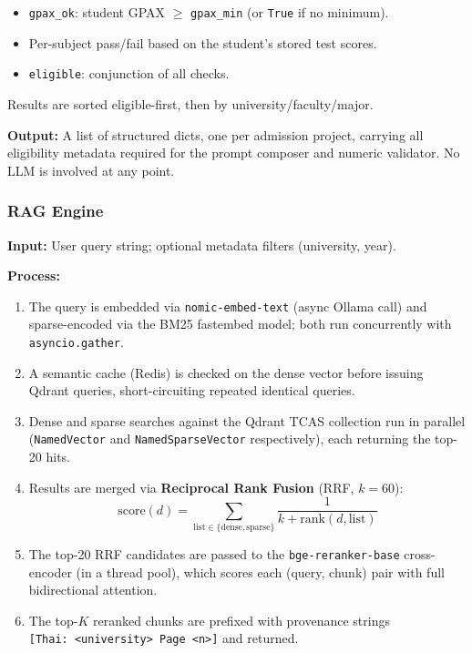 ﻿\documentclass[12pt,a4paper]{article}
\begin{document}
\begin{itemize}[leftmargin=2em]
    \item \texttt{gpax\_ok}: student GPAX $\geq$ \texttt{gpax\_min} (or \texttt{True}
    if no minimum).
    \item Per-subject pass/fail based on the student's stored test scores.
    \item \texttt{eligible}: conjunction of all checks.
\end{itemize}

Results are sorted eligible-first, then by university/faculty/major.

\textbf{Output:} A list of structured dicts, one per admission project, carrying
all eligibility metadata required for the prompt composer and numeric validator.
No LLM is involved at any point.

\subsubsection{RAG Engine}

\textbf{Input:} User query string; optional metadata filters (university, year).

\textbf{Process:}

\begin{enumerate}
    \item The query is embedded via \texttt{nomic-embed-text} (async Ollama call) and
    sparse-encoded via the BM25 fastembed model; both run concurrently with
    \texttt{asyncio.gather}.
    \item A semantic cache (Redis) is checked on the dense vector before issuing
    Qdrant queries, short-circuiting repeated identical queries.
    \item Dense and sparse searches against the Qdrant TCAS collection run in
    parallel (\texttt{NamedVector} and \texttt{NamedSparseVector} respectively),
    each returning the top-20 hits.
    \item Results are merged via \textbf{Reciprocal Rank Fusion} (RRF, $k=60$):
    \[
        \text{score}(d) = \sum_{\text{list}\in\{\text{dense},\text{sparse}\}}
        \frac{1}{k + \text{rank}(d, \text{list})}
    \]
    \item The top-20 RRF candidates are passed to the \texttt{bge-reranker-base}
    cross-encoder (in a thread pool), which scores each (query, chunk) pair
    with full bidirectional attention.
    \item The top-$K$ reranked chunks are prefixed with provenance strings
    \texttt{[Thai:\ <university> Page <n>]} and returned.
\end{enumerate}
\end{document}
